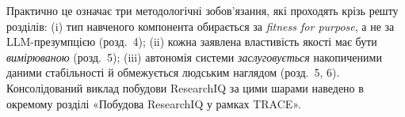 Практично це означає три методологічні зобов'язання, які проходять крізь решту розділів: (i) тип навченого компонента обирається за \emph{fitness for purpose}, а не за LLM-презумпцією (розд.~4); (ii) кожна заявлена властивість якості має бути \emph{вимірюваною} (розд.~5); (iii) автономія системи \emph{заслуговується} накопиченими даними стабільності й обмежується людським наглядом (розд.~5, 6). Консолідований виклад побудови ResearchIQ за цими шарами наведено в окремому розділі «Побудова ResearchIQ у рамках TRACE».
\fi